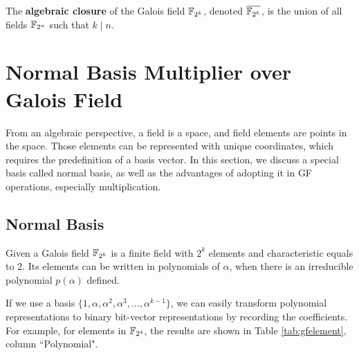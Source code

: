 \begin{Definition}
The {\bf algebraic closure} of the Galois field ${\mathbb{F}}_{2^k}$, denoted $\overline{{\mathbb{F}}_{2^k}}$, is the 
union of all fields ${\mathbb{F}}_{2^n}$ such that $k \mid n$.
\end{Definition}

\section{Normal Basis Multiplier over Galois Field}
From an algebraic perspective, a field is a space, and field elements are points in the space. Those elements can be 
represented with unique coordinates, which requires the predefinition of a basis vector. In this
section, we discuss a special basis called normal basis, as well as the advantages of adopting it in 
GF operations, especially multiplication.
\subsection{Normal Basis}
Given a Galois field ${\mathbb{F}}_{2^k}$ is a finite field with  $2^k$ elements and characteristic equals to 2.
Its elements can be written in polynomials of $\alpha$, when there is an irreducible polynomial $p(\alpha)$
defined.

If we use a basis $\{1,\alpha,\alpha^2,\alpha^3,\dots,\alpha^{k-1}\}$, we can easily transform polynomial representations
to binary bit-vector representations by recording the coefficients. For example, for elements in
${\mathbb{F}}_{2^4}$, the results are shown in Table \ref{tab:gfelement}, column ``Polynomial".


